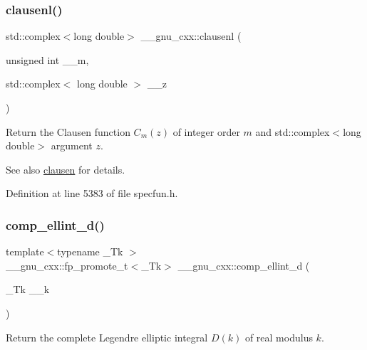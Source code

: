 \subsubsection{\texorpdfstring{clausenl()}{clausenl()}\hspace{0.1cm}{\footnotesize\ttfamily [2/2]}}
{\footnotesize\ttfamily std\+::complex$<$long double$>$ \+\_\+\+\_\+gnu\+\_\+cxx\+::clausenl (\begin{DoxyParamCaption}\item[{unsigned int}]{\+\_\+\+\_\+m,  }\item[{std\+::complex$<$ long double $>$}]{\+\_\+\+\_\+z }\end{DoxyParamCaption})\hspace{0.3cm}{\ttfamily [inline]}}

Return the Clausen function $ C_m(z) $ of integer order $ m $ and {\ttfamily std\+::complex$<$long double$>$} argument $ z $.

\begin{DoxySeeAlso}{See also}
\hyperlink{group__gnu__math__spec__func_ga54e4ba71b1f81718d6998349f91ff88f}{clausen} for details. 
\end{DoxySeeAlso}


Definition at line 5383 of file specfun.\+h.

\mbox{\label{group__gnu__math__spec__func_ga3fe79a91524b43ffc5ffb83c0eb2bd00}} 
\subsubsection{\texorpdfstring{comp\+\_\+ellint\+\_\+d()}{comp\_ellint\_d()}}
{\footnotesize\ttfamily template$<$typename \+\_\+\+Tk $>$ \\
\+\_\+\+\_\+gnu\+\_\+cxx\+::fp\+\_\+promote\+\_\+t$<$\+\_\+\+Tk$>$ \+\_\+\+\_\+gnu\+\_\+cxx\+::comp\+\_\+ellint\+\_\+d (\begin{DoxyParamCaption}\item[{\+\_\+\+Tk}]{\+\_\+\+\_\+k }\end{DoxyParamCaption})\hspace{0.3cm}{\ttfamily [inline]}}

Return the complete Legendre elliptic integral $ D(k) $ of real modulus $ k $.

